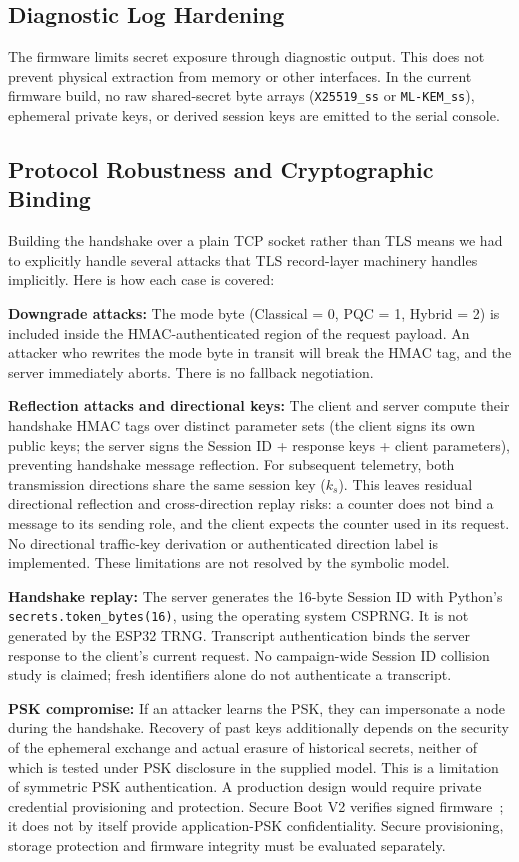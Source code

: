 \documentclass[journal, 10pt]{IEEEtran}
\begin{document}
\subsection{Diagnostic Log Hardening}
The firmware limits secret exposure through diagnostic output. This does not prevent physical extraction from memory or other interfaces. In the current firmware build, no raw shared-secret byte arrays (\texttt{X25519\_ss} or \texttt{ML-KEM\_ss}), ephemeral private keys, or derived session keys are emitted to the serial console.

\subsection{Protocol Robustness and Cryptographic Binding}
Building the handshake over a plain TCP socket rather than TLS means we had to explicitly handle several attacks that TLS record-layer machinery handles implicitly. Here is how each case is covered:

\textbf{Downgrade attacks:} The mode byte (Classical = 0, PQC = 1, Hybrid = 2) is included inside the HMAC-authenticated region of the request payload. An attacker who rewrites the mode byte in transit will break the HMAC tag, and the server immediately aborts. There is no fallback negotiation.

\textbf{Reflection attacks and directional keys:} The client and server compute their handshake HMAC tags over distinct parameter sets (the client signs its own public keys; the server signs the Session ID + response keys + client parameters), preventing handshake message reflection. For subsequent telemetry, both transmission directions share the same session key ($k_s$). This leaves residual directional reflection and cross-direction replay risks: a counter does not bind a message to its sending role, and the client expects the counter used in its request. No directional traffic-key derivation or authenticated direction label is implemented. These limitations are not resolved by the symbolic model.

\textbf{Handshake replay:} The server generates the 16-byte Session ID with Python's \texttt{secrets.token\_bytes(16)}, using the operating system CSPRNG. It is not generated by the ESP32 TRNG. Transcript authentication binds the server response to the client's current request. No campaign-wide Session ID collision study is claimed; fresh identifiers alone do not authenticate a transcript.

\textbf{PSK compromise:} If an attacker learns the PSK, they can impersonate a node during the handshake. Recovery of past keys additionally depends on the security of the ephemeral exchange and actual erasure of historical secrets, neither of which is tested under PSK disclosure in the supplied model. This is a limitation of symmetric PSK authentication. A production design would require private credential provisioning and protection. Secure Boot V2 verifies signed firmware~\cite{b44}; it does not by itself provide application-PSK confidentiality. Secure provisioning, storage protection and firmware integrity must be evaluated separately.
\end{document}
